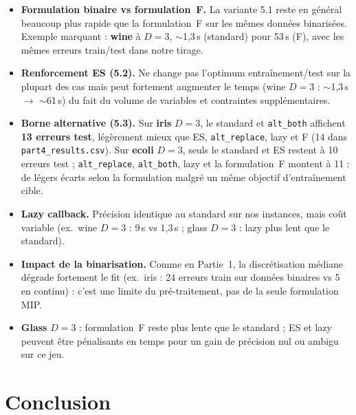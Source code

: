 \documentclass[a4paper,10pt,titlepage,leqno]{article}
\begin{document}
\begin{resultbox}
\begin{itemize}
  \item \textbf{Formulation binaire vs formulation~F.} La variante 5.1 reste en général beaucoup plus rapide que la formulation~F sur les mêmes données binarisées. Exemple marquant : \textbf{wine} à $D{=}3$, $\sim$1{,}3\,s (standard) pour 53\,s (F), avec les mêmes erreurs train/test dans notre tirage.
  \item \textbf{Renforcement ES (5.2).} Ne change pas l'optimum entraînement/test sur la plupart des cas mais peut fortement augmenter le temps (wine $D{=}3$ : $\sim$1{,}3\,s $\to$ $\sim$61\,s) du fait du volume de variables et contraintes supplémentaires.
  \item \textbf{Borne alternative (5.3).} Sur \textbf{iris} $D{=}3$, le standard et \texttt{alt\_both} affichent \textbf{13 erreurs test}, légèrement mieux que ES, \texttt{alt\_replace}, lazy et F (14 dans \texttt{part4\_results.csv}). Sur \textbf{ecoli} $D{=}3$, seuls le standard et ES restent à 10 erreurs test ; \texttt{alt\_replace}, \texttt{alt\_both}, lazy et la formulation~F montent à 11 : de légers écarts selon la formulation malgré un même objectif d'entraînement cible.
  \item \textbf{Lazy callback.} Précision identique au standard sur nos instances, mais coût variable (ex.\ wine $D{=}3$ : 9\,s vs 1{,}3\,s ; glass $D{=}3$ : lazy plus lent que le standard).
  \item \textbf{Impact de la binarisation.} Comme en Partie~1, la discrétisation médiane dégrade fortement le fit (ex.\ iris : 24 erreurs train sur données binaires vs 5 en continu) : c'est une limite du pré-traitement, pas de la seule formulation MIP.
  \item \textbf{Glass} $D{=}3$ : formulation~F reste plus lente que le standard ; ES et lazy peuvent être pénalisants en temps pour un gain de précision nul ou ambigu sur ce jeu.
\end{itemize}
\end{resultbox}


\section*{Conclusion}
\end{document}
